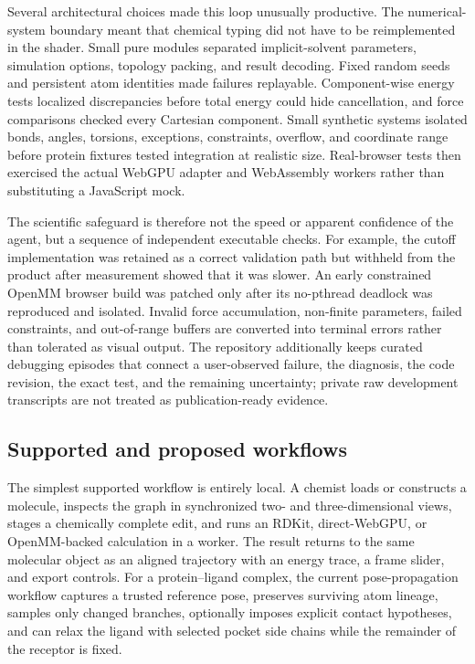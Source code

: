 Several architectural choices made this loop unusually productive.
The numerical-system boundary meant that chemical typing did not have to be
reimplemented in the shader.
Small pure modules separated implicit-solvent parameters, simulation options,
topology packing, and result decoding.
Fixed random seeds and persistent atom identities made failures replayable.
Component-wise energy tests localized discrepancies before total energy could
hide cancellation, and force comparisons checked every Cartesian component.
Small synthetic systems isolated bonds, angles, torsions, exceptions,
constraints, overflow, and coordinate range before protein fixtures tested
integration at realistic size.
Real-browser tests then exercised the actual WebGPU adapter and WebAssembly
workers rather than substituting a JavaScript mock.

The scientific safeguard is therefore not the speed or apparent confidence of
the agent, but a sequence of independent executable checks.
For example, the cutoff implementation was retained as a correct validation
path but withheld from the product after measurement showed that it was slower.
An early constrained OpenMM browser build was patched only after its no-pthread
deadlock was reproduced and isolated.
Invalid force accumulation, non-finite parameters, failed constraints, and
out-of-range buffers are converted into terminal errors rather than tolerated
as visual output.
The repository additionally keeps curated debugging episodes that connect a
user-observed failure, the diagnosis, the code revision, the exact test, and
the remaining uncertainty; private raw development transcripts are not treated
as publication-ready evidence.

\subsection{Supported and proposed workflows}
\label{app:workflows}

The simplest supported workflow is entirely local.
A chemist loads or constructs a molecule, inspects the graph in synchronized
two- and three-dimensional views, stages a chemically complete edit, and runs
an RDKit, direct-WebGPU, or OpenMM-backed calculation in a worker.
The result returns to the same molecular object as an aligned trajectory with
an energy trace, a frame slider, and export controls.
For a protein--ligand complex, the current pose-propagation workflow captures a
trusted reference pose, preserves surviving atom lineage, samples only changed
branches, optionally imposes explicit contact hypotheses, and can relax the
ligand with selected pocket side chains while the remainder of the receptor is
fixed.

